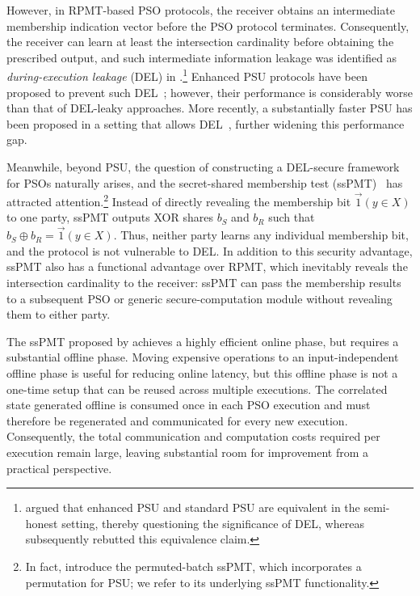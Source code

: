 However, in RPMT-based PSO protocols, the receiver obtains an intermediate membership indication vector before the PSO protocol terminates. Consequently, the receiver can learn at least the intersection cardinality before obtaining the prescribed output, and such intermediate information leakage was identified as \emph{during-execution leakage} (DEL) in \cite{JSZG24}.\footnote{\cite{PGT26} argued that enhanced PSU and standard PSU are equivalent in the semi-honest setting, thereby questioning the significance of DEL, whereas \cite[Appendix~B]{JSZG24} subsequently rebutted this equivalence claim.} Enhanced PSU protocols have been proposed to prevent such DEL~\cite{JSZG24,TBZ+25}; however, their performance is considerably worse than that of DEL-leaky approaches. More recently, a substantially faster PSU has been proposed in a setting that allows DEL~\cite{PT26}, further widening this performance gap.

Meanwhile, beyond PSU, the question of constructing a DEL-secure framework for PSOs naturally arises, and the secret-shared membership test (ssPMT)~\cite{WCS+26} has attracted attention.\footnote{In fact, \cite{WCS+26} introduce the permuted-batch ssPMT, which incorporates a permutation for PSU; we refer to its underlying ssPMT functionality.} Instead of directly revealing the membership bit $\vec 1(y\in X)$ to one party, ssPMT outputs XOR shares \(b_S\) and \(b_R\) such that $b_S \oplus b_R = \vec 1(y\in X).$
Thus, neither party learns any individual membership bit, and the protocol is not vulnerable to DEL. 
In addition to this security advantage, ssPMT also has a functional advantage over RPMT, which inevitably reveals the intersection cardinality to the receiver: ssPMT can pass the membership results to a subsequent PSO or generic secure-computation module without revealing them to either party.

The ssPMT proposed by \cite{WCS+26} achieves a highly efficient online phase, but requires a substantial offline phase. Moving expensive operations to an input-independent offline phase is useful for reducing online latency,  but this offline phase is not a one-time setup that can be reused across multiple executions. The correlated state generated offline is consumed once in each PSO execution and must therefore be regenerated and communicated for every new execution. Consequently, the total communication and computation costs required per execution remain large, leaving substantial room for improvement from a practical perspective.


